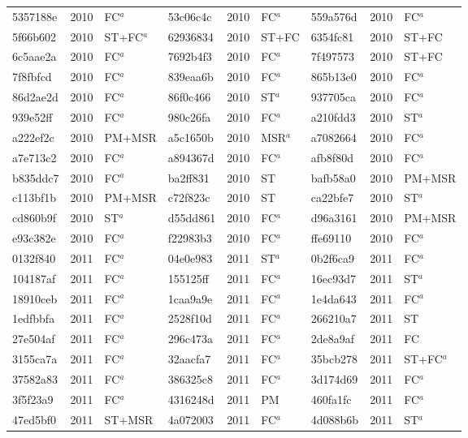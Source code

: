 \begin{longtable}{lll@{\hspace{10pt}}lll@{\hspace{10pt}}lll}
5357188e & 2010 & FC$^{a}$ & 53c06c4c & 2010 & FC$^{a}$ & 559a576d & 2010 & FC$^{a}$ \\
5f66b602 & 2010 & ST+FC$^{a}$ & 62936834 & 2010 & ST+FC & 6354fc81 & 2010 & ST+FC \\
6c5aae2a & 2010 & FC$^{a}$ & 7692b4f3 & 2010 & FC$^{a}$ & 7f497573 & 2010 & ST+FC \\
7f8fbfcd & 2010 & FC$^{a}$ & 839eaa6b & 2010 & FC$^{a}$ & 865b13e0 & 2010 & FC$^{a}$ \\
86d2ae2d & 2010 & FC$^{a}$ & 86f0c466 & 2010 & ST$^{a}$ & 937705ca & 2010 & FC$^{a}$ \\
939e52ff & 2010 & FC$^{a}$ & 980c26fa & 2010 & FC$^{a}$ & a210fdd3 & 2010 & ST$^{a}$ \\
a222ef2c & 2010 & PM+MSR & a5c1650b & 2010 & MSR$^{a}$ & a7082664 & 2010 & FC$^{a}$ \\
a7e713c2 & 2010 & FC$^{a}$ & a894367d & 2010 & FC$^{a}$ & afb8f80d & 2010 & FC$^{a}$ \\
b835ddc7 & 2010 & FC$^{a}$ & ba2ff831 & 2010 & ST & bafb58a0 & 2010 & PM+MSR \\
c113bf1b & 2010 & PM+MSR & c72f823c & 2010 & ST & ca22bfe7 & 2010 & ST$^{a}$ \\
cd860b9f & 2010 & ST$^{a}$ & d55dd861 & 2010 & FC$^{a}$ & d96a3161 & 2010 & PM+MSR \\
e93c382e & 2010 & FC$^{a}$ & f22983b3 & 2010 & FC$^{a}$ & ffe69110 & 2010 & FC$^{a}$ \\
0132f840 & 2011 & FC$^{a}$ & 04e0e983 & 2011 & ST$^{a}$ & 0b2f6ca9 & 2011 & FC$^{a}$ \\
104187af & 2011 & FC$^{a}$ & 155125ff & 2011 & FC$^{a}$ & 16ec93d7 & 2011 & ST$^{a}$ \\
18910ceb & 2011 & FC$^{a}$ & 1caa9a9e & 2011 & FC$^{a}$ & 1e4da643 & 2011 & FC$^{a}$ \\
1edfbbfa & 2011 & FC$^{a}$ & 2528f10d & 2011 & FC$^{a}$ & 266210a7 & 2011 & ST \\
27e504af & 2011 & FC$^{a}$ & 296c473a & 2011 & FC$^{a}$ & 2de8a9af & 2011 & FC \\
3155ca7a & 2011 & FC$^{a}$ & 32aacfa7 & 2011 & FC$^{a}$ & 35bcb278 & 2011 & ST+FC$^{a}$ \\
37582a83 & 2011 & FC$^{a}$ & 386325c8 & 2011 & FC$^{a}$ & 3d174d69 & 2011 & FC$^{a}$ \\
3f5f23a9 & 2011 & FC$^{a}$ & 4316248d & 2011 & PM & 460fa1fc & 2011 & FC$^{a}$ \\
47ed5bf0 & 2011 & ST+MSR & 4a072003 & 2011 & FC$^{a}$ & 4d088b6b & 2011 & ST$^{a}$ \\

\end{longtable}
